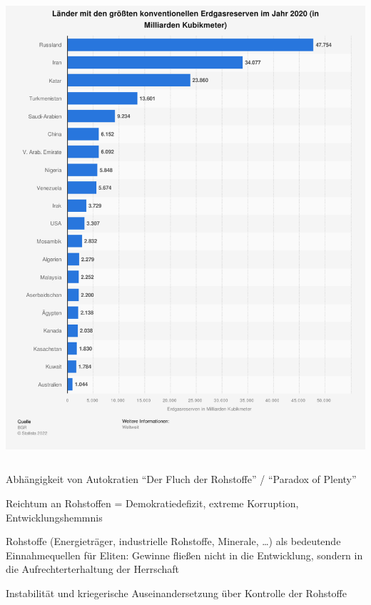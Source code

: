 \documentclass[10pt]{beamer}
\begin{document}
\begin{frame}
\begin{columns}
\includegraphics[height=0.95\textheight]{fig/erdgasreserven.png}
\centering
\scriptsize{}
\end{columns}
\end{frame}

\begin{frame}{Abhängigkeit von Autokratien}
  ``Der Fluch der Rohstoffe'' / ``Paradox of Plenty''

  Reichtum an Rohstoffen = Demokratiedefizit, extreme Korruption, Entwicklungshemmnis

  Rohstoffe (Energieträger, industrielle Rohstoffe, Minerale, \dots) als bedeutende Einnahmequellen für Eliten:
  Gewinne fließen nicht in die Entwicklung, sondern in die Aufrechterterhaltung der Herrschaft

  Instabilität und kriegerische Auseinandersetzung über Kontrolle der Rohstoffe

  \smallskip
  \scriptsize{}
\end{frame}
\end{document}
